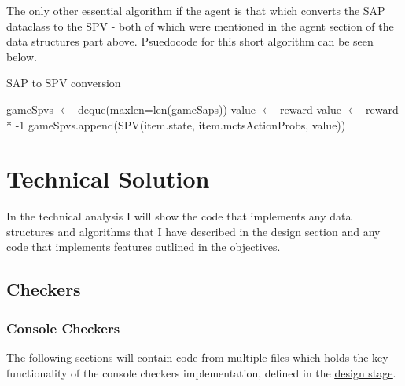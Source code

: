 \documentclass{article}
\newcommand{\myhy}[2]{\hyperref[#1]{\color{black}\setulcolor{black}\ul{#2}}}
\begin{document}
    The only other essential algorithm if the agent is that which converts the SAP dataclass to the SPV - both of which were mentioned
    in the agent section of the data structures part above. Psuedocode for this short algorithm can be seen below.

    \begin{algorithm} 
        \caption{SAP to SPV conversion}
        \begin{algorithmic}
            \State gameSpvs $\gets$ deque(maxlen=len(gameSaps))
                    \State value $\gets$ reward
                \Else
                    \State value $\gets$ reward * -1
                \EndIf
                \State gameSpvs.append(SPV(item.state, item.mctsActionProbs, value))
            \EndFor
        \EndFunction
        \end{algorithmic}
    \end{algorithm}

    \section{Technical Solution}
    \secttoc

    In the technical analysis I will show the code that implements any data structures and algorithms that I have described
    in the design section and any code that implements features outlined in the objectives.

    \subsection{Checkers}

    \subsubsection{Console Checkers}
    The following sections will contain code from multiple files which holds the key functionality
    of the console checkers implementation, defined in the \myhy{CheckersDesignStage}{design stage}.
\end{document}
